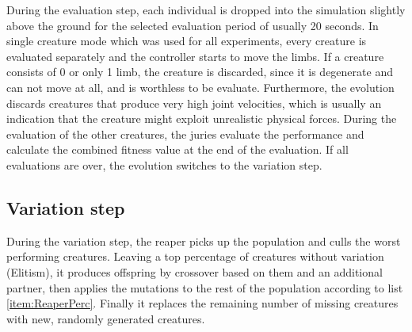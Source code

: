 \documentclass[main]{subfiles}
\begin{document}
During the evaluation step, each individual is dropped into the simulation slightly above the ground for the selected evaluation period of usually 20 seconds. %
%
In single creature mode which was used for all experiments, every creature is evaluated separately and the controller starts to move the limbs. %
%
If a creature consists of 0 or only 1 limb, the creature is discarded, since it is degenerate and can not move at all, and is worthless to be evaluate. %
%
Furthermore, the evolution discards creatures that produce very high joint velocities, which is usually an indication that the creature might exploit unrealistic physical forces. %
%
During the evaluation of the other creatures, the juries evaluate the performance and calculate the combined fitness value at the end of the evaluation. %
%
If all evaluations are over, the evolution switches to the variation step.

\subsection{Variation step}

During the variation step, the reaper picks up the population and culls the worst performing creatures. %
%
Leaving a top percentage of creatures without variation (Elitism), it produces offspring by crossover based on them and an additional partner, then applies the mutations to the rest of the population according to list \ref{item:ReaperPerc}. %
%
Finally it replaces the remaining number of missing creatures with new, randomly generated creatures.
\end{document}
